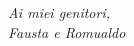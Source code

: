 \begin{flushright}
\textit{\large
Ai miei genitori,\\
\vspace{5pt}
Fausta e Romualdo 
}
\end{flushright}
